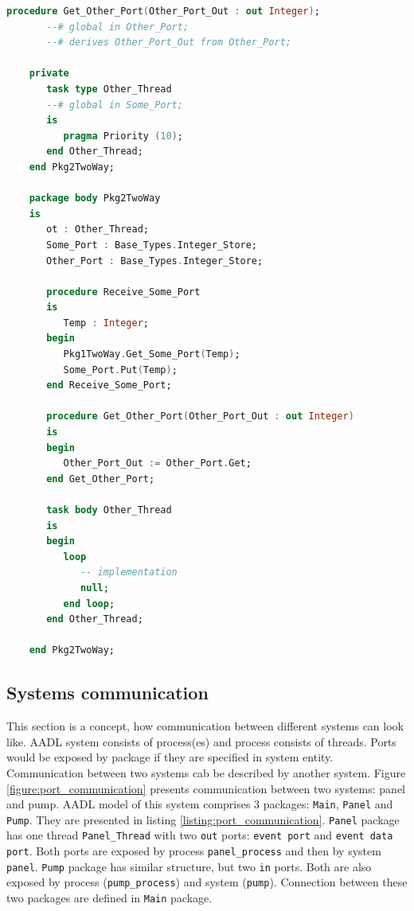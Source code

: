 \begin{lstlisting}[language=ada, frame=single, gobble=0, caption={Two way port communication translated to SPARK Ada}, label={listing:port_communication_thread_two_way_spark}]
	   procedure Get_Other_Port(Other_Port_Out : out Integer);
	   --# global in Other_Port;
	   --# derives Other_Port_Out from Other_Port;

	private
	   task type Other_Thread
	   --# global in Some_Port;
	   is
	      pragma Priority (10);
	   end Other_Thread;
	end Pkg2TwoWay;

	package body Pkg2TwoWay
	is
	   ot : Other_Thread;
	   Some_Port : Base_Types.Integer_Store;
	   Other_Port : Base_Types.Integer_Store;
	   
	   procedure Receive_Some_Port
	   is
	      Temp : Integer;
	   begin
	      Pkg1TwoWay.Get_Some_Port(Temp);
	      Some_Port.Put(Temp);
	   end Receive_Some_Port;   
	   
	   procedure Get_Other_Port(Other_Port_Out : out Integer)
	   is
	   begin
	      Other_Port_Out := Other_Port.Get;
	   end Get_Other_Port;
	   
	   task body Other_Thread
	   is   
	   begin      
	      loop         
	         -- implementation
	         null;         
	      end loop;      
	   end Other_Thread;

	end Pkg2TwoWay;
\end{lstlisting} 
\doublespacing


\subsection{Systems communication}
\label{codegen:port_communication:system}

This section is a concept, how communication between different systems can look like. AADL system consists of process(es) and process consists of threads. Ports would be exposed by package if they are specified in system entity. Communication between two systems cab be described by another system. Figure \ref{figure:port_communication} presents communication between two systems: panel and pump. AADL model of this system comprises 3 packages: \lstinline{Main}, \lstinline{Panel} and \lstinline{Pump}. They are presented in listing \ref{listing:port_communication}. \lstinline{Panel} package has one thread \lstinline{Panel_Thread} with two \lstinline{out} ports: \lstinline{event port} and \lstinline{event data port}. Both ports are exposed by process \lstinline{panel_process} and then by system \lstinline{panel}. \lstinline{Pump} package has similar structure, but two \lstinline{in} ports. Both are also exposed by process (\lstinline{pump_process}) and system (\lstinline{pump}). Connection between these two packages are defined in \lstinline{Main} package.

